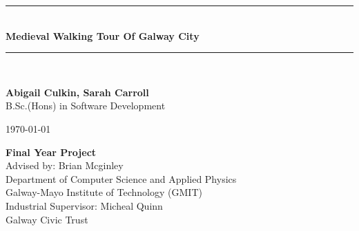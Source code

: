 \documentclass[12pt,a4paper,oneside,openany]{book}
\newcommand{\projecttitle}{Medieval Walking Tour Of Galway City}
\newcommand{\projectauthor}{Abigail Culkin, Sarah Carroll}
\newcommand{\projectadvisor}{Brian Mcginley}
\newcommand{\projectprogramme}{B.Sc.(Hons) in Software Development}
\newcommand{\industrialsupervisor}{Micheal Quinn}
\newcommand{\industrialcompany}{Galway Civic Trust}
\newcommand{\projectdate}{\today}
\begin{document}
  \begin{titlepage}
    \begin{minipage}[t][6cm]{\textwidth}
      \centering
      \rule{\linewidth}{0.5mm} \\[0.4cm]
      { \LARGE \bfseries \projecttitle \\[0.4cm] }
      \rule{\linewidth}{0.5mm} \\[0.8cm]
    \end{minipage}
	
	\begin{minipage}[t][6.5cm]{\textwidth}
      \centering
      \textbf{\projectauthor}\\[0.5cm]
      \projectprogramme
    \end{minipage}
  
    \begin{minipage}[t][1cm]{\textwidth}
      \centering
      \textsc{\projectdate}
    \end{minipage}
      
    \begin{minipage}[t][3cm]{\textwidth}
      \centering
      \textbf{Final Year Project}\\[0.3cm]
      Advised by: \projectadvisor \\[0.1cm]
      Department of Computer Science and Applied Physics\\
      Galway-Mayo Institute of Technology (GMIT)\\
      Industrial Supervisor: \industrialsupervisor\\
      \industrialcompany
	\end{minipage}
      
 \end{titlepage}
\end{document}
